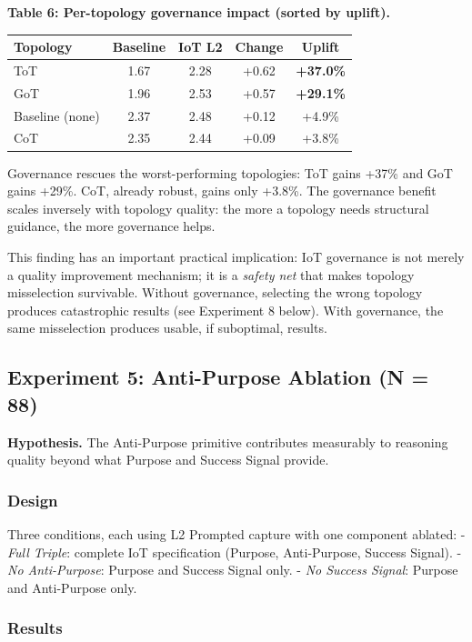 \documentclass[11pt,a4paper]{article}
\begin{document}
\textbf{Table 6: Per-topology governance impact (sorted by uplift).}

{\small\begin{longtable}[]{@{}lcccc@{}}
\toprule\noalign{}
Topology & Baseline & IoT L2 & Change & Uplift \\
\midrule\noalign{}
\endhead
\bottomrule\noalign{}
\endlastfoot
ToT & 1.67 & 2.28 & +0.62 & \textbf{+37.0\%} \\
GoT & 1.96 & 2.53 & +0.57 & \textbf{+29.1\%} \\
Baseline (none) & 2.37 & 2.48 & +0.12 & +4.9\% \\
CoT & 2.35 & 2.44 & +0.09 & +3.8\% \\
\end{longtable}}

Governance rescues the worst-performing topologies: ToT gains +37\% and
GoT gains +29\%. CoT, already robust, gains only +3.8\%. The governance
benefit scales inversely with topology quality: the more a topology
needs structural guidance, the more governance helps.

This finding has an important practical implication: IoT governance is
not merely a quality improvement mechanism; it is a \emph{safety net}
that makes topology misselection survivable. Without governance,
selecting the wrong topology produces catastrophic results (see
Experiment 8 below). With governance, the same misselection produces
usable, if suboptimal, results.

\subsection{Experiment 5: Anti-Purpose Ablation (N =
88)}\label{experiment-5-anti-purpose-ablation-n-88}

\textbf{Hypothesis.} The Anti-Purpose primitive contributes measurably
to reasoning quality beyond what Purpose and Success Signal provide.

\subsubsection{Design}\label{design}

Three conditions, each using L2 Prompted capture with one component
ablated: - \emph{Full Triple}: complete IoT specification (Purpose,
Anti-Purpose, Success Signal). - \emph{No Anti-Purpose}: Purpose and
Success Signal only. - \emph{No Success Signal}: Purpose and
Anti-Purpose only.

\subsubsection{Results}\label{results-1}
\end{document}
